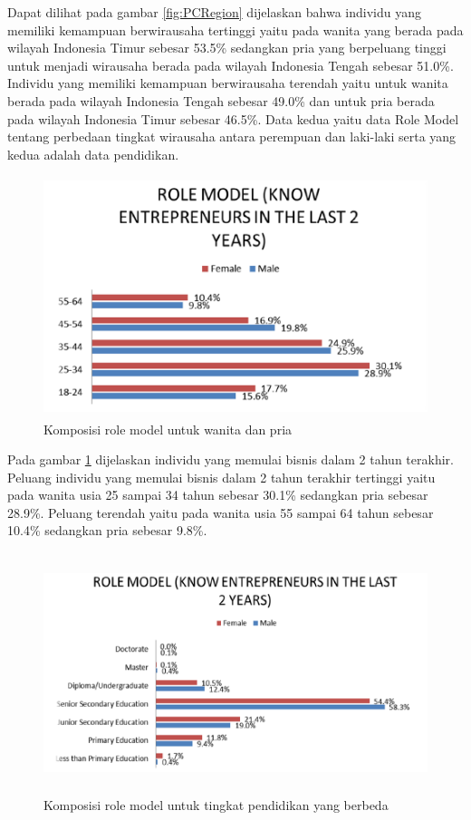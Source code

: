 \documentclass[a4paper,twoside]{article}
\begin{document}
\begin{enumerate}
Dapat dilihat pada gambar \ref{fig:PCRegion} dijelaskan bahwa individu yang memiliki kemampuan berwirausaha tertinggi yaitu pada wanita yang berada pada wilayah Indonesia Timur sebesar 53.5\% sedangkan pria yang berpeluang tinggi untuk menjadi wirausaha berada pada wilayah Indonesia Tengah sebesar 51.0\%. Individu yang memiliki kemampuan berwirausaha terendah yaitu untuk wanita berada pada wilayah Indonesia Tengah sebesar 49.0\% dan untuk pria berada pada wilayah Indonesia Timur sebesar 46.5\%. Data kedua yaitu data Role Model tentang perbedaan tingkat wirausaha antara perempuan dan laki-laki serta yang kedua adalah data pendidikan.

\begin{figure} [H]
	\centering  
	\includegraphics[width=12cm, height=7cm]{RMfemalemale} 
	\caption[Komposisi role model untuk wanita dan pria]{Komposisi role model untuk wanita dan pria} 
	\label{fig:RMfemalemale} 
\end{figure}


Pada gambar \ref{fig:RMfemalemale} dijelaskan individu yang memulai bisnis dalam 2 tahun terakhir. Peluang individu yang memulai bisnis dalam 2 tahun terakhir tertinggi yaitu pada wanita usia 25 sampai 34 tahun sebesar 30.1\% sedangkan pria sebesar 28.9\%. Peluang terendah yaitu pada wanita usia 55 sampai 64 tahun sebesar 10.4\% sedangkan pria sebesar 9.8\%.


\begin{figure} [H]
	\centering  
	\includegraphics[width=13cm, height=7cm]{RMpendidikan} 
	\caption[Komposisi role model untuk tingkat pendidikan yang berbeda]{Komposisi role model untuk tingkat pendidikan yang berbeda} 
	\label{fig:RMpendidikan} 
\end{figure}  



\end{enumerate}
\end{document}
